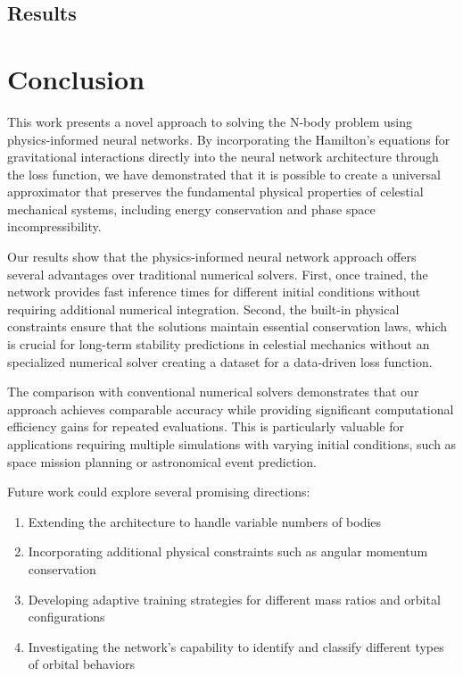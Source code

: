 \documentclass[draft]{agujournal2019}
\begin{document}
\subsection{Results}

\section{Conclusion}
This work presents a novel approach to solving the N-body problem using physics-informed neural networks. By incorporating the Hamilton's equations for gravitational interactions directly into the neural network architecture through the loss function, we have demonstrated that it is possible to create a universal approximator that preserves the fundamental physical properties of celestial mechanical systems, including energy conservation and phase space incompressibility.

Our results show that the physics-informed neural network approach offers several advantages over traditional numerical solvers. First, once trained, the network provides fast inference times for different initial conditions without requiring additional numerical integration. Second, the built-in physical constraints ensure that the solutions maintain essential conservation laws, which is crucial for long-term stability predictions in celestial mechanics without an specialized numerical solver creating a dataset for a data-driven loss function.

The comparison with conventional numerical solvers demonstrates that our approach achieves comparable accuracy while providing significant computational efficiency gains for repeated evaluations. This is particularly valuable for applications requiring multiple simulations with varying initial conditions, such as space mission planning or astronomical event prediction.

Future work could explore several promising directions:
\begin{enumerate}
    \item Extending the architecture to handle variable numbers of bodies
    \item Incorporating additional physical constraints such as angular momentum conservation
    \item Developing adaptive training strategies for different mass ratios and orbital configurations
    \item Investigating the network's capability to identify and classify different types of orbital behaviors
\end{enumerate}
\end{document}
